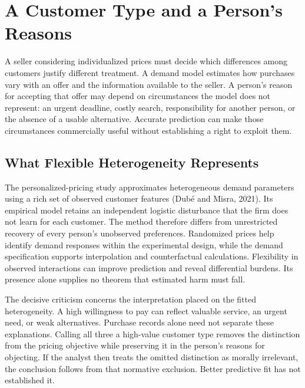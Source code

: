 
\hypertarget{M09-a-customer-type-and-a-persons-reasons}{%
\section{A Customer Type and a Person's
Reasons}\label{M09-a-customer-type-and-a-persons-reasons}}

\noindent \noindent A seller considering individualized prices must decide which
differences among customers justify different treatment. A demand model
estimates how purchases vary with an offer and the information available
to the seller. A person's reason for accepting that offer may depend on
circumstances the model does not represent: an urgent deadline, costly
search, responsibility for another person, or the absence of a usable
alternative. Accurate prediction can make those circumstances
commercially useful without establishing a right to exploit them.

\hypertarget{M09-what-flexible-heterogeneity-represents}{%
\subsection{What Flexible Heterogeneity
Represents}\label{M09-what-flexible-heterogeneity-represents}}

\noindent \noindent The personalized-pricing study approximates heterogeneous
demand parameters using a rich set of observed customer features (Dubé
and Misra, 2021). Its empirical model retains an independent logistic
disturbance that the firm does not learn for each customer. The method
therefore differs from unrestricted recovery of every person's
unobserved preferences. Randomized prices help identify demand responses
within the experimental design, while the demand specification supports
interpolation and counterfactual calculations. Flexibility in observed
interactions can improve prediction and reveal differential burdens. Its
presence alone supplies no theorem that estimated harm must fall.

The decisive criticism concerns the interpretation placed on the fitted
heterogeneity. A high willingness to pay can reflect valuable service,
an urgent need, or weak alternatives. Purchase records alone need not
separate these explanations. Calling all three a high-value customer
type removes the distinction from the pricing objective while preserving
it in the person's reasons for objecting. If the analyst then treats the
omitted distinction as morally irrelevant, the conclusion follows from
that normative exclusion. Better predictive fit has not established it.

